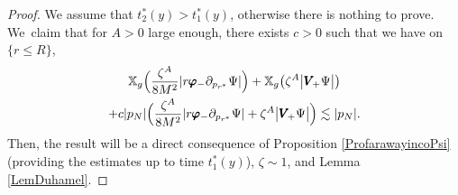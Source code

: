 \documentclass[JEP,XML,SOM,Unicode,published]{cedram}
\theoremstyle{plain}
\theoremstyle{definition}
\newcommand\T{{\mathbb{X}}}
\begin{document}
\begin{proof}
We assume that $t_2^*(y) >t_1^*(y)$, otherwise there is nothing to prove. We~claim that for $A >0$ large enough, there exists $c>0$ such that we have on $\{ r \leq R \}$,
\begin{multline}\label{equa:toprove}
\T_g \Bigl(\frac{\zeta^A}{8M^2}| r \pmb{\varphi}_- \partial_{p_{r^*}} \Psi| \Bigr)+\T_g \bigl(\zeta^A \big| \pmb{V}_{\! +} \Psi \big| \bigr)\\
+c|p_N| \Bigl(\frac{\zeta^A}{8M^2}| r \pmb{\varphi}_- \partial_{p_{r^*}} \Psi|+\zeta^A \big| \pmb{V}_{\! +} \Psi \big| \Bigr) \lesssim |p_N|.
\end{multline}
Then, the result will be a direct consequence of Proposition \ref{ProfarawayincoPsi} (providing the estimates up to time $t_1^*(y)$), $\zeta \sim 1$, and Lemma \ref{LemDuhamel}.


\end{proof}
\end{document}
